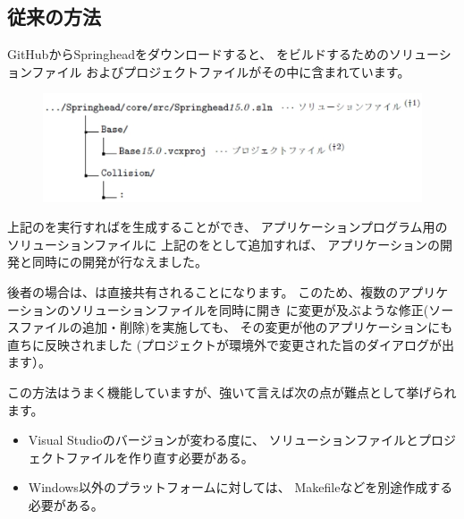 \subsection{従来の方法}
\label{subsec:ConventionalMethod}

\noindent
GitHubからSpringheadをダウンロードすると、
\SprLib をビルドするためのソリューションファイル
およびプロジェクトファイルがその中に含まれています。

\medskip
\ifLwarp
{}
\begin{narrow}[15pt]
	\begin{figure}[h]
	    \begin{center}
	    \includegraphics[width=.9\textwidth]{fig/DownloadTree.eps}
	    \end{center}
	    \label{fig:DownloadTree}
	\end{figure}
\end{narrow}
\else
\begin{narrow}
    \begin{narrow}[20pt]\begin{minipage}{\textwidth}
	{\footnotesize{}}
	\medskip
  \end{minipage}\end{narrow}
\end{narrow}
\fi

\noindent
上記の\SolutionFile を実行すれば\SprLib を生成することができ、
アプリケーションプログラム用のソリューションファイルに
上記の\ProjectFile をとして追加すれば、
アプリケーションの開発と同時に\SprLib の開発が行なえました。

後者の場合は、\ProjectFile は直接共有されることになります。
このため、複数のアプリケーションのソリューションファイルを同時に開き
\ProjectFile に変更が及ぶような修正(ソースファイルの追加・削除)を実施しても、
その変更が他のアプリケーションにも直ちに反映されました
(プロジェクトが環境外で変更された旨のダイアログが出ます）。

\medskip
\noindent
この方法はうまく機能していますが、強いて言えば次の点が難点として挙げられます。

\begin{itemize}
  \item	Visual Studioのバージョンが変わる度に、
	ソリューションファイルとプロジェクトファイルを作り直す必要がある。
  \item	Windows以外のプラットフォームに対しては、
	Makefileなどを別途作成する必要がある。
\end{itemize}

